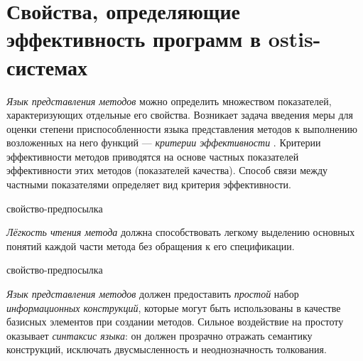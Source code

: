 \section{Свойства, определяющие эффективность программ в ostis-системах}
\label{sec_programs_method_kriteria}

\textit{Язык представления методов} можно определить множеством показателей, характеризующих отдельные его свойства. Возникает задача введения меры для оценки степени приспособленности языка представления методов к выполнению возложенных на него функций — \textit{критерии эффективности} \cite{Orlov2013}. Критерии эффективности методов приводятся на основе частных показателей эффективности этих методов (показателей качества). Способ связи между частными показателями определяет вид критерия эффективности.

\begin{SCn}
\begin{scnrelfromlist}{свойство-предпосылка}
\end{scnrelfromlist}
\end{SCn}

\textit{Лёгкость чтения метода} должна способствовать легкому выделению основных понятий каждой части метода без обращения к его спецификации.

\begin{SCn}
\begin{scnrelfromlist}{свойство-предпосылка}
\end{scnrelfromlist}
\end{SCn}

\textit{Язык представления методов} должен предоставить \textit{простой} набор \textit{информационных конструкций}, которые могут быть использованы в качестве базисных элементов при создании методов.
Сильное воздействие на простоту оказывает \textit{синтаксис языка}: он должен прозрачно отражать семантику конструкций, исключать двусмысленность и неоднозначность толкования.

